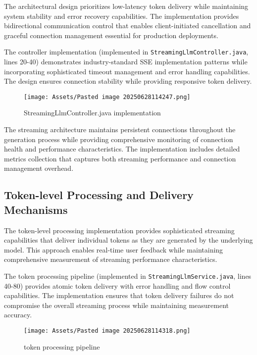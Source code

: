 The architectural design prioritizes low-latency token delivery while maintaining system stability and error recovery capabilities. The implementation provides bidirectional communication control that enables client-initiated cancellation and graceful connection management essential for production deployments.

The controller implementation (implemented in \texttt{StreamingLlmController.java}, lines 20-40) demonstrates industry-standard SSE implementation patterns while incorporating sophisticated timeout management and error handling capabilities. The design ensures connection stability while providing responsive token delivery.

\begin{figure}[H]
    \centering
    \texttt{[image: Assets/Pasted image 20250628114247.png]}
    \caption{StreamingLlmController.java implementation}
\end{figure}

The streaming architecture maintains persistent connections throughout the generation process while providing comprehensive monitoring of connection health and performance characteristics. The implementation includes detailed metrics collection that captures both streaming performance and connection management overhead.

\subsection{Token-level Processing and Delivery Mechanisms}

The token-level processing implementation provides sophisticated streaming capabilities that deliver individual tokens as they are generated by the underlying model. This approach enables real-time user feedback while maintaining comprehensive measurement of streaming performance characteristics.

The token processing pipeline (implemented in \texttt{StreamingLlmService.java}, lines 40-80) provides atomic token delivery with error handling and flow control capabilities. The implementation ensures that token delivery failures do not compromise the overall streaming process while maintaining measurement accuracy.

\begin{figure}[H]
    \centering
    \texttt{[image: Assets/Pasted image 20250628114318.png]}
    \caption{token processing pipeline }
\end{figure}


